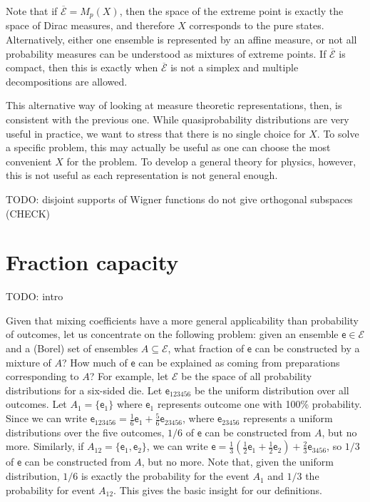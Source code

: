 \documentclass[10pt,twocolumn, nofootinbib]{revtex4-2}
\newcommand{\ens}[1][e] {\mathsf{#1}} %
\newcommand{\Ens}[1][E] {\mathcal{#1}} %
\begin{document}
Note that if $\overline{\Ens} = M_p(X)$, then the space of the extreme point is exactly the space of Dirac measures, and therefore $X$ corresponds to the pure states. Alternatively, either one ensemble is represented by an affine measure, or not all probability measures can be understood as mixtures of extreme points. If $\overline{\Ens}$ is compact, then this is exactly when $\overline{\Ens}$ is not a simplex and multiple decompositions are allowed.

This alternative way of looking at measure theoretic representations, then, is consistent with the previous one. While quasiprobability distributions are very useful in practice, we want to stress that there is no single choice for $X$. To solve a specific problem, this may actually be useful as one can choose the most convenient $X$ for the problem. To develop a general theory for physics, however, this is not useful as each representation is not general enough.

TODO: disjoint supports of Wigner functions do not give orthogonal subspaces (CHECK)

\section{Fraction capacity}

TODO: intro

Given that mixing coefficients have a more general applicability than probability of outcomes, let us concentrate on the following problem: given an ensemble $\ens \in \Ens$ and a (Borel) set of ensembles $A \subseteq \Ens$, what fraction of $\ens$ can be constructed by a mixture of $A$? How much of $\ens$ can be explained as coming from preparations corresponding to $A$? For example, let $\Ens$ be the space of all probability distributions for a six-sided die. Let $\ens_{123456}$ be the uniform distribution over all outcomes. Let $A_1 = \{\ens_1\}$ where $\ens_1$ represents outcome one with 100\% probability. Since we can write $\ens_{123456} = \frac{1}{6} \ens_{1} + \frac{5}{6} \ens_{23456}$, where $\ens_{23456}$ represents a uniform distributions over the five outcomes, $1/6$ of $\ens$ can be constructed from $A$, but no more. Similarly, if $A_{12} = \{\ens_{1},\ens_{2}\}$, we can write $\ens = \frac{1}{3} \left(\frac{1}{2} \ens_1 + \frac{1}{2} \ens_2 \right)  + \frac{2}{3} \ens_{3456}$, so $1/3$ of $\ens$ can be constructed from $A$, but no more. Note that, given the uniform distribution, $1/6$ is exactly the probability for the event $A_1$ and $1/3$ the probability for event $A_{12}$. This gives the basic insight for our definitions.
\end{document}
